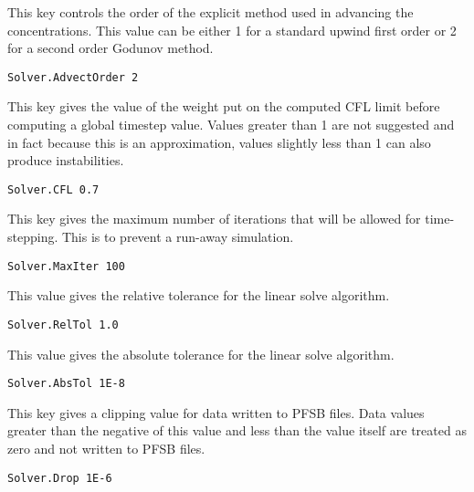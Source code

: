 {
This key controls the order of the explicit method used in
advancing the concentrations.  This value can be either 1 for
a standard upwind first order or 2 for a second order
Godunov method.
}
\begin{display}\begin{verbatim}
Solver.AdvectOrder 2
\end{verbatim}\end{display}

{
This key gives the value of the weight put on the computed
CFL limit before computing a global timestep value.  Values
greater than 1 are not suggested and in fact because this is
an approximation, values slightly less than 1 can also produce
instabilities.
}
\begin{display}\begin{verbatim}
Solver.CFL 0.7
\end{verbatim}\end{display}

{
This key gives the maximum number of iterations that will
be allowed for time-stepping.  This is to prevent a run-away
simulation.
}
\begin{display}\begin{verbatim}
Solver.MaxIter 100
\end{verbatim}\end{display}

{
This value gives the relative tolerance for the linear
solve algorithm.
}
\begin{display}\begin{verbatim}
Solver.RelTol 1.0
\end{verbatim}\end{display}

{
This value gives the absolute tolerance for the linear
solve algorithm.
}
\begin{display}\begin{verbatim}
Solver.AbsTol 1E-8
\end{verbatim}\end{display}

{
This key gives a clipping value for data written to PFSB
files.  Data values greater than the negative of this
value and less than the value itself are treated as zero
and not written to PFSB files.
}
\begin{display}\begin{verbatim}
Solver.Drop 1E-6
\end{verbatim}\end{display}

